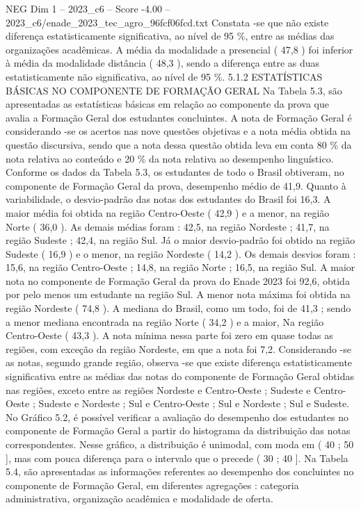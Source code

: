 \begin{textsample}{NEG Dim 1 – 2023\_c6 – Score -4.00 – 2023\_c6/enade\_2023\_tec\_agro\_96fcf06fcd.txt}
Constata -se que não existe diferença estatisticamente significativa, ao nível de 95 \%, entre as médias das organizações acadêmicas.
A média da modalidade a presencial ( 47,8 ) foi inferior à média da modalidade distância ( 48,3 ), sendo a diferença entre as duas estatisticamente não significativa, ao nível de 95 \%. 5.1.2 ESTATÍSTICAS BÁSICAS NO COMPONENTE DE FORMAÇÃO GERAL Na Tabela 5.3, são apresentadas as estatísticas básicas em relação ao componente da prova que avalia a Formação Geral dos estudantes concluintes.
A nota de Formação Geral é considerando -se os acertos nas nove questões objetivas e a nota média obtida na questão discursiva, sendo que a nota dessa questão obtida leva em conta 80 \% da nota relativa ao conteúdo e 20 \% da nota relativa ao desempenho linguístico.
Conforme os dados da Tabela 5.3, os estudantes de todo o Brasil obtiveram, no componente de Formação Geral da prova, desempenho médio de 41,9.
Quanto à variabilidade, o desvio-padrão das notas dos estudantes do Brasil foi 16,3.
A maior média foi obtida na região Centro-Oeste ( 42,9 ) e a menor, na região Norte ( 36,0 ).
As demais médias foram : 42,5, na região Nordeste ; 41,7, na região Sudeste ; 42,4, na região Sul.
Já o maior desvio-padrão foi obtido na região Sudeste ( 16,9 ) e o menor, na região Nordeste ( 14,2 ).
Os demais desvios foram : 15,6, na região Centro-Oeste ; 14,8, na região Norte ; 16,5, na região Sul.
A maior nota no componente de Formação Geral da prova do Enade 2023 foi 92,6, obtida por pelo menos um estudante na região Sul.
A menor nota máxima foi obtida na região Nordeste ( 74,8 ).
A mediana do Brasil, como um todo, foi de 41,3 ; sendo a menor mediana encontrada na região Norte ( 34,2 ) e a maior, Na região Centro-Oeste ( 43,3 ).
A nota mínima nessa parte foi zero em quase todas as regiões, com exceção da região Nordeste, em que a nota foi 7,2.
Considerando -se as notas, segundo grande região, observa -se que existe diferença estatisticamente significativa entre as médias das notas do componente de Formação Geral obtidas nas regiões, exceto entre as regiões Nordeste e Centro-Oeste ; Sudeste e Centro-Oeste ; Sudeste e Nordeste ; Sul e Centro-Oeste ; Sul e Nordeste ; Sul e Sudeste.
No Gráfico 5.2, é possível verificar a avaliação do desempenho dos estudantes no componente de Formação Geral a partir do histograma da distribuição das notas correspondentes.
Nesse gráfico, a distribuição é unimodal, com moda em ( 40 ; 50 ], mas com pouca diferença para o intervalo que o precede ( 30 ; 40 ].
Na Tabela 5.4, são apresentadas as informações referentes ao desempenho dos concluintes no componente de Formação Geral, em diferentes agregações : categoria administrativa, organização acadêmica e modalidade de oferta.

\end{textsample}
